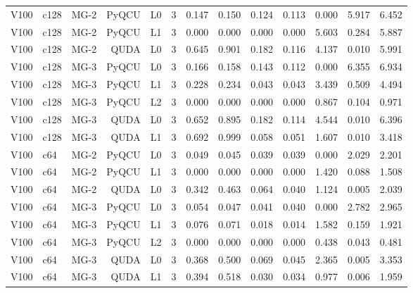 \begin{longtable}{@{}lllrrrrrrrrrr@{}}
V100 & c128 & MG-2 & PyQCU & L0 & 3 & 0.147 & 0.150 & 0.124 & 0.113 & 0.000 & 5.917 & 6.452 \\
V100 & c128 & MG-2 & PyQCU & L1 & 3 & 0.000 & 0.000 & 0.000 & 0.000 & 5.603 & 0.284 & 5.887 \\
V100 & c128 & MG-2 & QUDA & L0 & 3 & 0.645 & 0.901 & 0.182 & 0.116 & 4.137 & 0.010 & 5.991 \\
V100 & c128 & MG-3 & PyQCU & L0 & 3 & 0.166 & 0.158 & 0.143 & 0.112 & 0.000 & 6.355 & 6.934 \\
V100 & c128 & MG-3 & PyQCU & L1 & 3 & 0.228 & 0.234 & 0.043 & 0.043 & 3.439 & 0.509 & 4.494 \\
V100 & c128 & MG-3 & PyQCU & L2 & 3 & 0.000 & 0.000 & 0.000 & 0.000 & 0.867 & 0.104 & 0.971 \\
V100 & c128 & MG-3 & QUDA & L0 & 3 & 0.652 & 0.895 & 0.182 & 0.114 & 4.544 & 0.010 & 6.396 \\
V100 & c128 & MG-3 & QUDA & L1 & 3 & 0.692 & 0.999 & 0.058 & 0.051 & 1.607 & 0.010 & 3.418 \\
V100 & c64 & MG-2 & PyQCU & L0 & 3 & 0.049 & 0.045 & 0.039 & 0.039 & 0.000 & 2.029 & 2.201 \\
V100 & c64 & MG-2 & PyQCU & L1 & 3 & 0.000 & 0.000 & 0.000 & 0.000 & 1.420 & 0.088 & 1.508 \\
V100 & c64 & MG-2 & QUDA & L0 & 3 & 0.342 & 0.463 & 0.064 & 0.040 & 1.124 & 0.005 & 2.039 \\
V100 & c64 & MG-3 & PyQCU & L0 & 3 & 0.054 & 0.047 & 0.041 & 0.040 & 0.000 & 2.782 & 2.965 \\
V100 & c64 & MG-3 & PyQCU & L1 & 3 & 0.076 & 0.071 & 0.018 & 0.014 & 1.582 & 0.159 & 1.921 \\
V100 & c64 & MG-3 & PyQCU & L2 & 3 & 0.000 & 0.000 & 0.000 & 0.000 & 0.438 & 0.043 & 0.481 \\
V100 & c64 & MG-3 & QUDA & L0 & 3 & 0.368 & 0.500 & 0.069 & 0.045 & 2.365 & 0.005 & 3.353 \\
V100 & c64 & MG-3 & QUDA & L1 & 3 & 0.394 & 0.518 & 0.030 & 0.034 & 0.977 & 0.006 & 1.959 \\
\bottomrule
\end{longtable}
